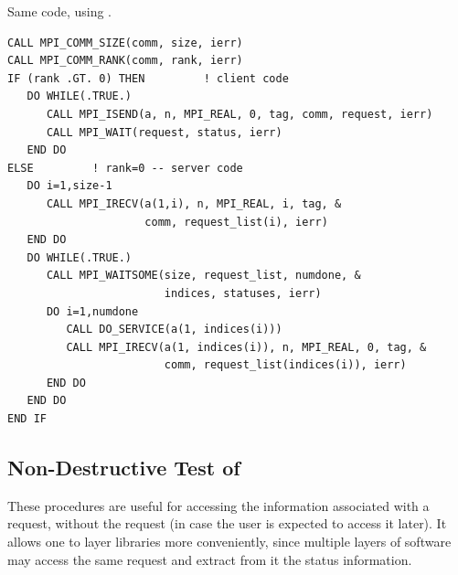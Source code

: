 \begin{example}
\label{pt2pt-exO}
%
%
Same code, using .
\begin{lstlisting}[language={[MPI]Fortran}]
CALL MPI_COMM_SIZE(comm, size, ierr)
CALL MPI_COMM_RANK(comm, rank, ierr)
IF (rank .GT. 0) THEN         ! client code
   DO WHILE(.TRUE.)
      CALL MPI_ISEND(a, n, MPI_REAL, 0, tag, comm, request, ierr)
      CALL MPI_WAIT(request, status, ierr)
   END DO
ELSE         ! rank=0 -- server code
   DO i=1,size-1
      CALL MPI_IRECV(a(1,i), n, MPI_REAL, i, tag, &
                     comm, request_list(i), ierr)
   END DO
   DO WHILE(.TRUE.)
      CALL MPI_WAITSOME(size, request_list, numdone, &
                        indices, statuses, ierr)
      DO i=1,numdone
         CALL DO_SERVICE(a(1, indices(i)))
         CALL MPI_IRECV(a(1, indices(i)), n, MPI_REAL, 0, tag, &
                        comm, request_list(indices(i)), ierr)
      END DO
   END DO
END IF
\end{lstlisting}
\end{example}



\subsection{Non-Destructive Test of \texorpdfstring{}{status}}
\label{subsec:pt2pt-teststatus}

These procedures are useful for accessing the information associated with a
request, without  the request (in case the user is expected to access
it later).  It allows one to layer libraries more conveniently,
since multiple layers of software may access the same  request and
extract from it the status information.

